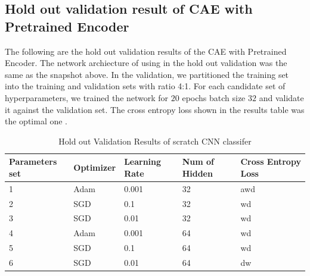 \documentclass{article}
\begin{document}
\subsection{Hold out validation result of CAE with Pretrained Encoder}

The following are the hold out validation results of the CAE with Pretrained Encoder. The network archiecture of using in the hold out validation was the same as the snapshot above. In the validation, we partitioned the training set into the training and validation sets with ratio 4:1. For each candidate set of hyperparameters, we trained the network for $20$ epochs batch size $32$ and validate it against the validation set. The cross entropy loss shown in the results table was the optimal one .


\begin{table}[htb]
\caption{Hold out Validation Results of scratch CNN classifer}
	\label{sample-table}
	\centering
\begin{tabular}{lllll}
\toprule
		\cmidrule{1-5}
		Parameters set& Optimizer & Learning Rate & Num of Hidden & Cross Entropy Loss 		\\
		\midrule
 			1 & Adam & 0.001 & 32 & awd \\
 			2 & SGD & 0.1 & 32 &  wd\\
 			3 & SGD & 0.01 & 32 & wd \\
			4 & Adam & 0.001 & 64 & wd \\
 			5 & SGD & 0.1 & 64 &  wd\\
 			6 & SGD & 0.01 & 64 & dw \\
\bottomrule
\end{tabular}
\end{table}
\end{document}
